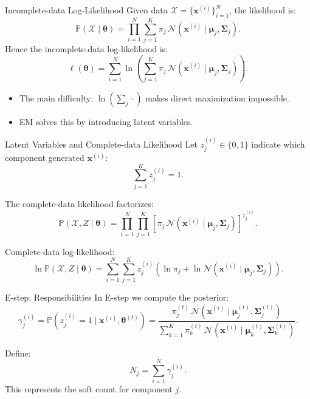 \documentclass[serif, aspectratio=169]{beamer}
\begin{document}
\begin{frame}{Incomplete-data Log-Likelihood}
Given data $\mathcal{X}=\{\mathbf{x}^{(i)}\}_{i=1}^{N}$, the likelihood is:
\[
\mathbb{P}(\mathcal{X}\mid\boldsymbol{\theta})
= 
\prod_{i=1}^{N}
\sum_{j=1}^{K}
\pi_j \,
\mathcal{N}(\mathbf{x}^{(i)}\mid \mathbf{\mu}_j, \mathbf{\Sigma}_j).
\]
Hence the incomplete-data log-likelihood is:
\[
\ell(\boldsymbol{\theta})
=
\sum_{i=1}^{N}
\ln
\left(
\sum_{j=1}^{K}
\pi_j \,
\mathcal{N}(\mathbf{x}^{(i)}\mid \mathbf{\mu}_j, \mathbf{\Sigma}_j)
\right).
\]

\begin{itemize}
    \item The main difficulty: $\ln(\sum_j \cdot)$ makes direct maximization impossible.
    \item EM solves this by introducing latent variables.
\end{itemize}
\end{frame}

\begin{frame}{Latent Variables and Complete-data Likelihood}
Let $z^{(i)}_j \in \{0,1\}$ indicate which component generated $\mathbf{x}^{(i)}$:
\[
\sum_{j=1}^{K} z^{(i)}_j = 1.
\]

The complete-data likelihood factorizes:
\[
\mathbb{P}(\mathcal{X}, Z \mid \boldsymbol{\theta})
=
\prod_{i=1}^N
\prod_{j=1}^K
\left[
\pi_j \,
\mathcal{N}(\mathbf{x}^{(i)} \mid \mathbf{\mu}_j, \mathbf{\Sigma}_j)
\right]^{z^{(i)}_j}.
\]

Complete-data log-likelihood:
\[
\ln
\mathbb{P}(\mathcal{X}, Z \mid \boldsymbol{\theta})
=
\sum_{i=1}^{N}
\sum_{j=1}^{K}
z^{(i)}_j
\left(
\ln \pi_j
+
\ln \mathcal{N}(\mathbf{x}^{(i)}\mid \mathbf{\mu}_j, \mathbf{\Sigma}_j)
\right).
\]
\end{frame}

\begin{frame}{E-step: Responsibilities}
In E-step we compute the posterior:
\[
\gamma_j^{(i)}
=
\mathbb{P}(z^{(i)}_j=1 \mid \mathbf{x}^{(i)}, \boldsymbol{\theta}^{(t)})
=
\frac{
\pi_j^{(t)}
\,
\mathcal{N}(\mathbf{x}^{(i)}\mid \mathbf{\mu}^{(t)}_j, \mathbf{\Sigma}^{(t)}_j)
}{
\sum_{k=1}^{K}
\pi_k^{(t)}
\,
\mathcal{N}(\mathbf{x}^{(i)}\mid \mathbf{\mu}^{(t)}_k, \mathbf{\Sigma}^{(t)}_k)
}.
\]

Define:
\[
N_j = \sum_{i=1}^{N} \gamma_j^{(i)}.
\]
This represents the soft count for component $j$.
\end{frame}
\end{document}

